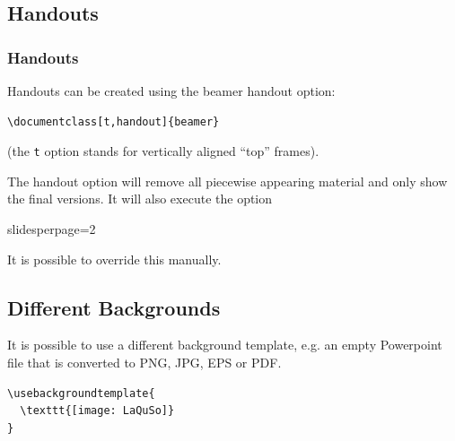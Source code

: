 \documentclass[t]{beamer}
\begin{document}
\subsection{Handouts}
\begin{frame}[fragile]
\frametitle{Handouts}

Handouts can be created using the beamer {\sf handout} option:

\begin{lstlisting}
\documentclass[t,handout]{beamer}
\end{lstlisting}

(the {\tt t} option stands for vertically aligned ``top'' frames).

The {\sf handout} option will remove all piecewise appearing material and only show the final versions. It will also execute the option

{\sf slidesperpage=2}

It is possible to override this manually.
\end{frame}


\subsection{Different Backgrounds}
\begin{frame}[fragile]

\color{white}
It is possible to use a different background template, e.g. an empty Powerpoint file that is converted to PNG, JPG, EPS or PDF.

\begin{lstlisting}
\usebackgroundtemplate{
  \texttt{[image: LaQuSo]}
}
\end{lstlisting}

\end{frame}
\end{document}
